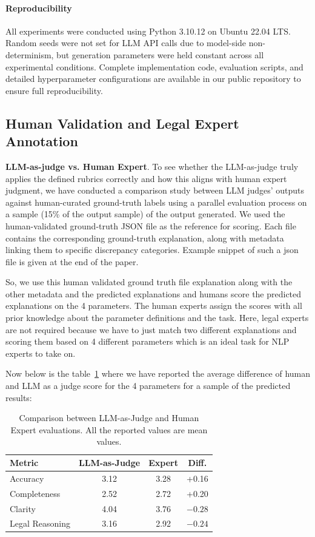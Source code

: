 \documentclass[11pt]{article}
\begin{document}
\paragraph{Reproducibility} All experiments were conducted using Python 3.10.12 on Ubuntu 22.04 LTS. Random seeds were not set for LLM API calls due to model-side non-determinism, but generation parameters were held constant across all experimental conditions. Complete implementation code, evaluation scripts, and detailed hyperparameter configurations are available in our public repository to ensure full reproducibility.

\subsection{Human Validation and Legal Expert Annotation}
\label{sec:expert-annotation}
\textbf{LLM-as-judge vs. Human Expert}. To see whether the LLM-as-judge truly applies the defined rubrics correctly and how this aligns with human expert judgment, we have conducted a comparison study between LLM judges’ outputs against human-curated ground-truth labels using a parallel evaluation process on a sample (15\% of the output sample) of the output generated. We used the human-validated ground-truth JSON file as the reference for scoring. Each file contains the corresponding ground-truth explanation, along with metadata linking them to specific discrepancy categories. Example snippet of such a json file is given at the end of the paper.

So, we use this human validated ground truth file explanation along with the other metadata and the predicted explanations and humans score the predicted explanations on the 4 parameters. The human experts assign the scores with all prior knowledge about the parameter definitions and the task. Here, legal experts are not required because we have to just match two different explanations and scoring them based on 4 different parameters which is an ideal task for NLP experts to take on.

Now below is the table~\ref{tab:llm_vs_human} where we have reported the average difference of human and LLM as a judge score for the 4 parameters for a sample of the predicted results:

\begin{table}[h]
\centering
\small
\begin{tabular}{lccc}
\hline
\textbf{Metric} & \textbf{LLM-as-Judge} & \textbf{Expert} & \textbf{Diff.} \\
\hline
Accuracy          & 3.12 & 3.28 & +0.16 \\
Completeness      & 2.52 & 2.72 & +0.20 \\
Clarity           & 4.04 & 3.76 & $-0.28$ \\
Legal Reasoning   & 3.16 & 2.92 & $-0.24$ \\
\hline
\end{tabular}
\caption{Comparison between LLM-as-Judge and Human Expert evaluations. All the reported values are mean values.}
\label{tab:llm_vs_human}
\end{table}
\end{document}

